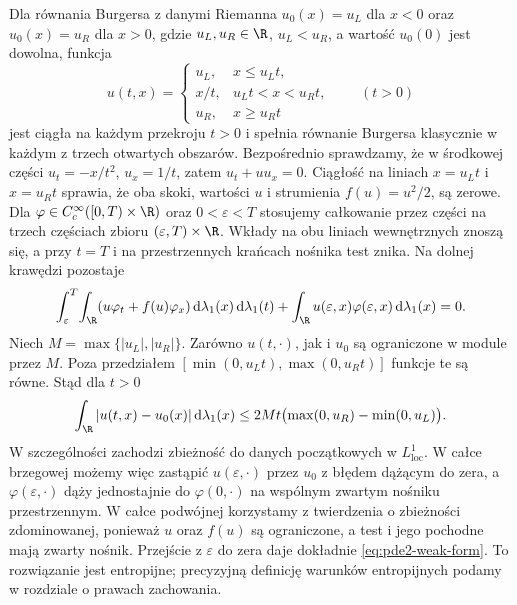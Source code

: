 \begin{przyklad}
\label{ex:pde2-rarefaction}
Dla równania Burgersa z danymi Riemanna
$u_0(x)=u_L$ dla $x<0$ oraz $u_0(x)=u_R$ dla $x>0$,
gdzie $u_L,u_R\in\R$, $u_L<u_R$, a wartość $u_0(0)$
jest dowolna, funkcja
\[
 u(t,x)=
 \begin{cases}
 u_L,&x\leq u_Lt,\\
 x/t,&u_Lt<x<u_Rt,\\
 u_R,&x\geq u_Rt
 \end{cases}
 \qquad(t>0)
\]
jest ciągła na każdym przekroju $t>0$ i spełnia
równanie Burgersa klasycznie w każdym z trzech
otwartych obszarów. Bezpośrednio sprawdzamy, że
w środkowej części $u_t=-x/t^2$, $u_x=1/t$,
zatem $u_t+uu_x=0$. Ciągłość na liniach
$x=u_Lt$ i $x=u_Rt$ sprawia, że oba skoki, wartości $u$
i strumienia $f(u)=u^2/2$, są zerowe.
Dla $\varphi\in C_c^\infty([0,T)\times\R)$ oraz
$0<\varepsilon<T$ stosujemy całkowanie przez części
na trzech częściach zbioru $(\varepsilon,T)\times\R$.
Wkłady na obu liniach wewnętrznych znoszą się,
a przy $t=T$ i na przestrzennych krańcach nośnika
test znika. Na dolnej krawędzi pozostaje
\[
 \int_\varepsilon^T\!\int_\R
 (u\varphi_t+f(u)\varphi_x)\,
 \mathrm d\lambda_1(x)\,\mathrm d\lambda_1(t)
 +\int_\R u(\varepsilon,x)\varphi(\varepsilon,x)\,
 \mathrm d\lambda_1(x)=0.
\]
Niech $M=\max\{|u_L|,|u_R|\}$. Zarówno $u(t,\cdot)$,
jak i $u_0$ są ograniczone w module przez $M$.
Poza przedziałem
$[\min(0,u_Lt),\max(0,u_Rt)]$ funkcje te są równe.
Stąd dla $t>0$
\[
 \int_\R |u(t,x)-u_0(x)|\,\mathrm d\lambda_1(x)
 \le 2Mt\bigl(\max(0,u_R)-\min(0,u_L)\bigr).
\]
W szczególności zachodzi zbieżność do danych początkowych
w $L^1_{\mathrm{loc}}$. W całce brzegowej możemy więc
zastąpić $u(\varepsilon,\cdot)$ przez $u_0$ z błędem
dążącym do zera, a $\varphi(\varepsilon,\cdot)$ dąży
jednostajnie do $\varphi(0,\cdot)$ na wspólnym zwartym
nośniku przestrzennym. W całce podwójnej korzystamy
z twierdzenia o zbieżności zdominowanej, ponieważ
$u$ oraz $f(u)$ są ograniczone, a test i jego pochodne
mają zwarty nośnik. Przejście z $\varepsilon$ do zera
daje dokładnie \eqref{eq:pde2-weak-form}.
To rozwiązanie jest entropijne; precyzyjną definicję
warunków entropijnych podamy w rozdziale o prawach zachowania.
\end{przyklad}


